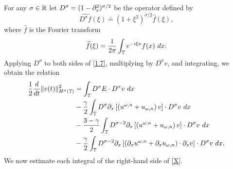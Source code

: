 For any $\sigma \in \mathbb{R}$ let   $D^\sigma=(1-\partial_x^2)^{\sigma/2}$ be the  operator
defined by 
%
$$ \widehat{D^\sigma f}(\xi) \doteq (1 + \xi^2)^{\sigma/2} \widehat{f}(\xi), $$
%
where $ \widehat{f}$ is the Fourier transform
%
$$ \widehat{f}(\xi) =  \frac{1}{2\pi}\int_{\mathbb{T}} e^{-i \xi x} f(x) \ dx.  $$
%
%
Applying $D^\sigma$ to both sides of \eqref{1.7}, multiplying by
$D^\sigma v$, and integrating, we obtain the
relation
%
%
\begin{equation}
\begin{split}
\frac{1}{2}\frac{d}{dt}\|v(t)\|_{H^\sigma(\mathbb{T})}^2
& = \int_{\mathbb{T}} D^\sigma E \cdot D^\sigma
v \ dx
\\
&-
\frac{\gamma}{2}\int_{\mathbb{T}} D^\sigma
\partial_x \left[ \left( u^{\omega,n} + u_{\omega,n} \right)v
\right]\cdot D^\sigma v \ dx
\\
& -
\frac{3-\gamma}{2}\int_{\mathbb{T}} D^{\sigma
-2} \partial_x \left[ \left( u^{\omega,n} + u_{\omega,n}
\right)v \right] \cdot D^\sigma v \ dx
\\
& - \frac{\gamma}{2}\int_{\mathbb{T}} D^{\sigma
-2}
\partial_x \left[ \left( \partial_x u^{\omega,n} + \partial_x u_{\omega,n}
\right)\cdot \partial_x v \right] \cdot
D^\sigma v \ dx.
\label{X}
\end{split}
\end{equation}
%
%
We now estimate each integral of the right-hand side
of \eqref{X}.

